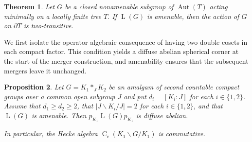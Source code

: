 \documentclass[11pt]{amsart}
\numberwithin{equation}{section}
\DeclareMathOperator{\LL}{L}
\DeclareMathOperator{\Aut}{Aut}
\newcommand{\abs}[1]{\left\lvert #1\right\rvert}
\newcommand{\rC}{\operatorname{C}}
\newcommand{\Hk}[2]{\rC_c(#2\backslash #1/#2)}
\newtheorem{The}{Theorem}[section]
\newtheorem{Prop}[The]{Proposition}
\theoremstyle{definition}
\begin{document}
\begin{The}
    \label{thm:amenability-boundary}
    Let $G$ be a closed nonamenable subgroup of $\Aut(T)$ acting minimally on a locally finite tree $T$. If $\LL(G)$ is amenable, then the action of $G$ on $\partial T$ is two-transitive.
\end{The}

We first isolate the operator algebraic consequence of having two double cosets in each compact factor. This condition yields a diffuse abelian spherical corner at the start of the merger construction, and amenability ensures that the subsequent mergers leave it unchanged.

\begin{Prop}
    \label{prop:diffuse-spherical-corner}
    Let $G=K_1\ast_JK_2$ be an amalgam of second countable compact groups over a common open subgroup $J$ and put $d_i=[K_i:J]$ for each $i\in\{1,2\}$. Assume that $d_1\geq d_2\geq2$, that $\abs{J\backslash K_i/J}=2$ for each $i\in\{1,2\}$, and that $\LL(G)$ is amenable. Then $p_{K_1}\LL(G)p_{K_1}$ is diffuse abelian.

    In particular, the Hecke algebra $\Hk G{K_1}$ is commutative.
\end{Prop}
\end{document}
